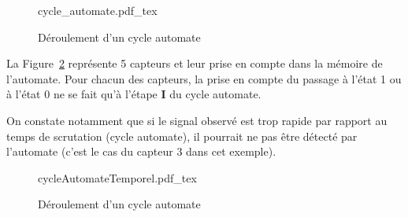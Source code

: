 \begin{figure}[h!t]
  \centering
  \def\svgwidth{.4\textwidth}
  {cycle_automate.pdf_tex}
  \caption{Déroulement d'un cycle automate}
  \label{fig:cycleAutomate}
\end{figure}

La Figure~\ref{fig:cycleAutomateCapteurToEntree} représente 5 capteurs et leur prise en compte dans la mémoire de l'automate. Pour chacun des capteurs, la prise en compte du passage à l'état 1 ou à l'état 0 ne se fait qu'à l'étape \textbf{I} du cycle automate.

On constate notamment que si le signal observé est trop rapide par rapport au temps de scrutation (cycle automate), il pourrait ne pas être détecté par l'automate (c'est le cas du capteur 3 dans cet exemple). 






\begin{UPSTIactivite}
\end{UPSTIactivite}

\begin{figure}[p]
  \centering
  \def\svgwidth{.9\textwidth}
  {cycleAutomateTemporel.pdf_tex}
  \caption{Déroulement d'un cycle automate}
  \label{fig:cycleAutomateCapteurToEntree}
\end{figure}

